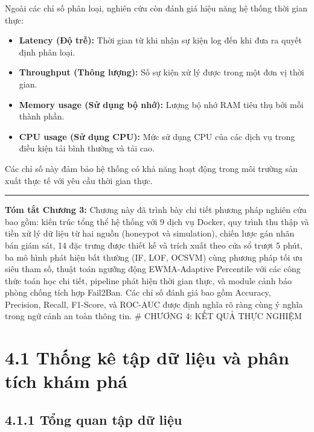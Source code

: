 \documentclass[
  a4paper]{report}
\providecommand{\tightlist}{%
  \setlength{\itemsep}{0pt}\setlength{\parskip}{0pt}}
\begin{document}
Ngoài các chỉ số phân loại, nghiên cứu còn đánh giá hiệu năng hệ thống
thời gian thực:

\begin{itemize}
\tightlist
\item
  \textbf{Latency (Độ trễ):} Thời gian từ khi nhận sự kiện log đến khi
  đưa ra quyết định phân loại.
\item
  \textbf{Throughput (Thông lượng):} Số sự kiện xử lý được trong một đơn
  vị thời gian.
\item
  \textbf{Memory usage (Sử dụng bộ nhớ):} Lượng bộ nhớ RAM tiêu thụ bởi
  mỗi thành phần.
\item
  \textbf{CPU usage (Sử dụng CPU):} Mức sử dụng CPU của các dịch vụ
  trong điều kiện tải bình thường và tải cao.
\end{itemize}

Các chỉ số này đảm bảo hệ thống có khả năng hoạt động trong môi trường
sản xuất thực tế với yêu cầu thời gian thực.

\begin{center}\rule{0.5\linewidth}{0.5pt}\end{center}

\textbf{Tóm tắt Chương 3:} Chương này đã trình bày chi tiết phương pháp
nghiên cứu bao gồm: kiến trúc tổng thể hệ thống với 9 dịch vụ Docker,
quy trình thu thập và tiền xử lý dữ liệu từ hai nguồn (honeypot và
simulation), chiến lược gán nhãn bán giám sát, 14 đặc trưng được thiết
kế và trích xuất theo cửa sổ trượt 5 phút, ba mô hình phát hiện bất
thường (IF, LOF, OCSVM) cùng phương pháp tối ưu siêu tham số, thuật toán
ngưỡng động EWMA-Adaptive Percentile với các công thức toán học chi
tiết, pipeline phát hiện thời gian thực, và module cảnh báo phòng chống
tích hợp Fail2Ban. Các chỉ số đánh giá bao gồm Accuracy, Precision,
Recall, F1-Score, và ROC-AUC được định nghĩa rõ ràng cùng ý nghĩa trong
ngữ cảnh an toàn thông tin. \# CHƯƠNG 4: KẾT QUẢ THỰC NGHIỆM

\section{4.1 Thống kê tập dữ liệu và phân tích khám
phá}\label{thux1ed1ng-kuxea-tux1eadp-dux1eef-liux1ec7u-vuxe0-phuxe2n-tuxedch-khuxe1m-phuxe1}

\subsection{4.1.1 Tổng quan tập dữ
liệu}\label{tux1ed5ng-quan-tux1eadp-dux1eef-liux1ec7u}
\end{document}
